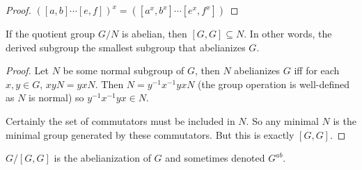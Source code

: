 \documentclass[10pt]{article}
\begin{document}
\begin{proof}
	$([a, b] \cdots [e, f])^x = ([a^x, b^x] \cdots [e^x, f^x])$
\end{proof}

\begin{theorem}
	If the quotient group $G / N$ is abelian, then $[G, G] \subseteq N$. In other
	words, the derived subgroup the smallest subgroup that abelianizes $G$.
\end{theorem}

\begin{proof}
	Let $N$ be some normal subgroup of $G$, then $N$ abelianizes $G$ iff for each
	$x, y \in G$, $xyN = yxN$. Then $N = y^{-1}x^{-1}yxN$ (the group operation is
	well-defined as $N$ is normal) so $y^{-1}x^{-1}yx \in N$. 

	Certainly the set of commutators must be included in $N$. So any minimal $N$
	is the minimal group generated by these commutators. But this is exactly $[G,
	G]$.
\end{proof}

\begin{definition}
	$G / [G, G]$ is the abelianization of $G$ and sometimes denoted $G^{ab}$.
\end{definition}
\end{document}
